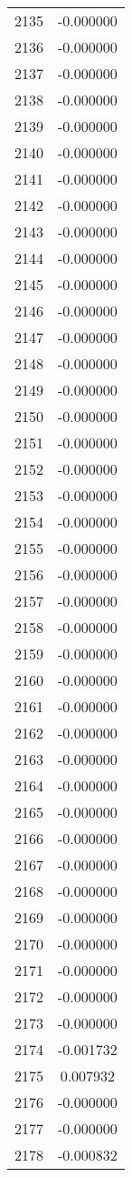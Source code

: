 \documentclass[12pt]{article}
\begin{document}
\begin{longtable}{@{}cc@{}}
2135 & -0.000000 \\
2136 & -0.000000 \\
2137 & -0.000000 \\
2138 & -0.000000 \\
2139 & -0.000000 \\
2140 & -0.000000 \\
2141 & -0.000000 \\
2142 & -0.000000 \\
2143 & -0.000000 \\
2144 & -0.000000 \\
2145 & -0.000000 \\
2146 & -0.000000 \\
2147 & -0.000000 \\
2148 & -0.000000 \\
2149 & -0.000000 \\
2150 & -0.000000 \\
2151 & -0.000000 \\
2152 & -0.000000 \\
2153 & -0.000000 \\
2154 & -0.000000 \\
2155 & -0.000000 \\
2156 & -0.000000 \\
2157 & -0.000000 \\
2158 & -0.000000 \\
2159 & -0.000000 \\
2160 & -0.000000 \\
2161 & -0.000000 \\
2162 & -0.000000 \\
2163 & -0.000000 \\
2164 & -0.000000 \\
2165 & -0.000000 \\
2166 & -0.000000 \\
2167 & -0.000000 \\
2168 & -0.000000 \\
2169 & -0.000000 \\
2170 & -0.000000 \\
2171 & -0.000000 \\
2172 & -0.000000 \\
2173 & -0.000000 \\
2174 & -0.001732 \\
2175 & 0.007932 \\
2176 & -0.000000 \\
2177 & -0.000000 \\
2178 & -0.000832 \\

\end{longtable}
\end{document}
